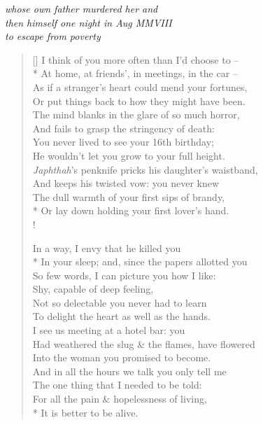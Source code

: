 \begin{center}
    \textit{whose own father murdered her and}\\
    \textit{then himself one night in Aug MMVIII}\\
    \textit{to escape from poverty}
\end{center}

\bigskip

\settowidth{\versewidth}{I think of you more often than I'd choose to --}
\begin{verse}[\versewidth]
    I think of you more often than I'd choose to --\\*
    At home, at friends', in meetings, in the car --\\
    As if a stranger's heart could mend your fortunes,\\
    Or put things back to how they might have been.\\
    The mind blanks in the glare of so much horror,\\
    And fails to grasp the stringency of death:\\
    You never lived to see your 16th birthday;\\
    He wouldn't let you grow to your full height.\\
    \textit{Japhthah}'s penknife pricks his daughter's waistband,\\
    And keeps his twisted vow: you never knew\\
    The dull warmth of your first sips of brandy,\\*
    Or lay down holding your first lover's hand.\\!

    In a way, I envy that he killed you\\*
    In your sleep; and, since the papers allotted you\\
    So few words, I can picture you how I like:\\
    Shy, capable of deep feeling,\\
    Not so delectable you never had to learn\\
    To delight the heart as well as the hands.\\
    I see us meeting at a hotel bar: you\\
    Had weathered the slug \& the flames, have flowered\\
    Into the woman you promised to become.\\
    And in all the hours we talk you only tell me\\
    The one thing that I needed to be told:\\
    For all the pain \& hopelessness of living,\\*
    It is better to be alive.
\end{verse}
